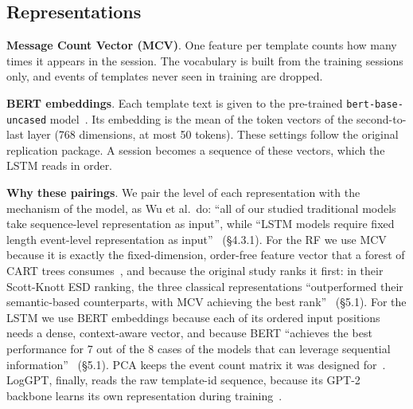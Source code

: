 \documentclass[10pt, conference]{IEEEtran}
\renewcommand{\paragraph}[1]{\noindent\textbf{#1}.}
\begin{document}
\subsection{Representations}

\paragraph{Message Count Vector (MCV)} One feature per template counts how many times it appears in the session. The vocabulary is built from the training sessions only, and events of templates never seen in training are dropped.

\paragraph{BERT embeddings} Each template text is given to the pre-trained \texttt{bert-base-uncased} model~\cite{devlin2019bert}. Its embedding is the mean of the token vectors of the second-to-last layer (768 dimensions, at most 50 tokens). These settings follow the original replication package. A session becomes a sequence of these vectors, which the LSTM reads in order.

\paragraph{Why these pairings} We pair the level of each representation with the mechanism of the model, as Wu et al.~do: ``all of our studied traditional models take sequence-level representation as input'', while ``LSTM models require fixed length event-level representation as input''~\cite{wu2023effectiveness} (\S4.3.1). For the RF we use MCV because it is exactly the fixed-dimension, order-free feature vector that a forest of CART trees consumes~\cite{breiman2001random}, and because the original study ranks it first: in their Scott-Knott ESD ranking, the three classical representations ``outperformed their semantic-based counterparts, with MCV achieving the best rank''~\cite{wu2023effectiveness} (\S5.1). For the LSTM we use BERT embeddings because each of its ordered input positions needs a dense, context-aware vector, and because BERT ``achieves the best performance for 7 out of the 8 cases of the models that can leverage sequential information''~\cite{wu2023effectiveness} (\S5.1). PCA keeps the event count matrix it was designed for~\cite{xu2009detecting}. LogGPT, finally, reads the raw template-id sequence, because its GPT-2 backbone learns its own representation during training~\cite{han2023loggpt}.
\end{document}
